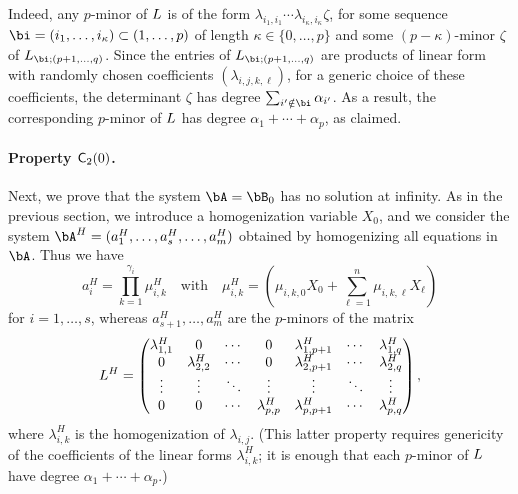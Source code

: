 \documentclass[12pt]{article}
\begin{document}
Indeed, any $p$-minor of ${L}$ is of the form $\lambda_{i_1,i_1}
\cdots \lambda_{i_\kappa,i_\kappa} \zeta$, for some sequence
$\bi=(i_1,\dots,i_\kappa) \subset (1,\dots,p)$ of length $\kappa \in
\{0,\dots,p\}$ and some $(p-\kappa)$-minor $\zeta$ of $\mL_{\bi
  \mathbf{;}(p+1,\dots,q)}$.  Since the entries of $\mL_{\bi
  \mathbf{;}(p+1,\dots,q)}$ are products of linear form with randomly
chosen coefficients $(\lambda_{i,j,k,\ell})$, for a generic choice of
these coefficients, the determinant $\zeta$ has degree
$\sum_{i' \notin \bi} \alpha_{i'}$. As a result, the corresponding
$p$-minor of ${L}$ has degree $\alpha_1 + \cdots + \alpha_p$, as
claimed.

\paragraph{Property $\mathsf{C}_2(0)$.} Next, we prove that the system $\bA=\bB_0$ has no solution 
at infinity. As in the previous section, we introduce a homogenization
variable $X_0$, and we consider the system $\bA^H=(a_1^H,\dots,a_s^H,\dots,a_m^H)$ obtained 
by homogenizing all equations in $\bA$. Thus we have
$$a_i^H=\prod_{k=1}^{\gamma_i} \mu^H_{i,k} \quad\text{with}\quad \mu^H_{i,k}=(\mu_{i,k,0}X_0 + \sum_{\ell = 1}^{n}\mu_{i,k,\ell}X_\ell)$$
for $i=1,\dots,s$, whereas $a_{s+1}^H,\dots,a_m^H$ are the $p$-minors of the matrix
\begin{align*}
{L}^H = \left( \begin{matrix}
\lambda^H_{1,1} & 0 & \cdots & 0 & \lambda^H_{1,p+1} & \cdots & \lambda^H_{1, q}\\
0 & \lambda^H_{2,2} & \cdots & 0 & \lambda^H_{2,p+1} & \cdots & \lambda^H_{2, q}\\
\vdots & \vdots & \ddots & \vdots & \vdots & \ddots & \vdots\\
0 & 0 & \cdots & \lambda^H_{p,p} & \lambda^H_{p,p+1} & \cdots & \lambda^H_{p, q}
\end{matrix} \right),  
\end{align*}
where $\lambda^H_{i,k}$ is the homogenization of
$\lambda_{i,j}$. (This latter property requires genericity of the
coefficients of the linear forms $\lambda^H_{i,k}$; it is enough that 
each $p$-minor of ${L}$ have degree $\alpha_1 + \cdots + \alpha_p$.)
\end{document}
